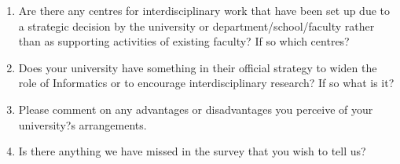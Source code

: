\begin{enumerate}
\begin{enumerate}
\item Are there any centres for interdisciplinary work that have been set
up due to a strategic decision by the university or
department/school/faculty rather than as supporting activities of
existing faculty? If so which centres?
\item Does your university have something in their official strategy to
widen the role of Informatics or to encourage interdisciplinary
research? If so what is it?
\item Please comment on any advantages or disadvantages you perceive of your university?s arrangements.
\item Is there anything we have missed in the survey that you wish to tell us?
\end{enumerate}
\end{enumerate}


